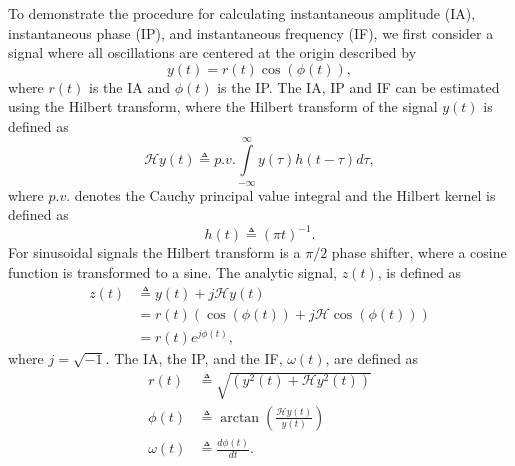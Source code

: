 \documentclass[a4paper]{IEEEtran}
\begin{document}
To demonstrate the procedure for calculating instantaneous amplitude (IA), instantaneous phase (IP), and instantaneous frequency (IF), we first consider a signal where all oscillations are centered at the origin described by
\begin{equation}
	y(t) = r(t)\cos(\phi(t)),
\end{equation}
where $r(t)$ is the IA and $\phi(t)$ is the IP. The IA, IP and IF can be estimated using the Hilbert transform, where the Hilbert transform of the signal $y(t)$ is defined as
\begin{equation}\label{eq:HilbertTransform}
	\mathcal{H}y\left( t \right) \triangleq p.v.\int\limits_{ - \infty }^\infty  {y\left( \tau  \right)h\left( {t - \tau } \right)} d\tau,
\end{equation}
where $p.v.$ denotes the Cauchy principal value integral and the Hilbert kernel is defined as
\begin{equation}\label{eq:HilbertKernel}
	h\left( t \right) \triangleq {\left( {\pi t} \right)^{ - 1}}.
\end{equation}
For sinusoidal signals the Hilbert transform is a $\pi/2$ phase shifter, where a cosine function is transformed to a sine. The analytic signal, $z(t)$, is defined as
\begin{align}\label{eq:AnalyticSignal}
	z\left( t \right) &\triangleq y\left( t \right) + j\mathcal{H}y\left( t \right) \\
    &= r\left( t \right)\left(\cos\left(\phi\left(t\right)\right) + j \mathcal{H}\cos\left(\phi\left(t\right)\right)\right) \\
&= r\left( t \right){e^{j\phi \left( t \right)}},
\end{align}
where $j=\sqrt{-1}$. The IA, the IP, and the IF, $\omega(t)$, are defined as
\begin{align}\label{eq:InstantaneousFreq}
	r(t) &\triangleq \sqrt{\left(y^2(t) + \mathcal{H}y^2(t)\right)}\\
	\phi(t) &\triangleq \arctan\left(\frac{\mathcal{H}y\left( t \right)}{y\left(t\right)}\right) \\
\omega \left( t \right) &\triangleq \frac{d\phi \left( t \right)}{dt}.
\end{align}
\end{document}
